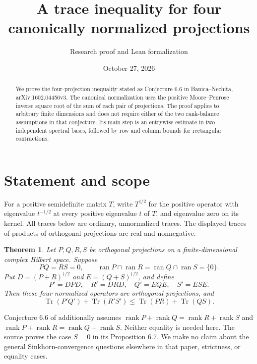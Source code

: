\documentclass[11pt]{article}
\title{A trace inequality for four canonically normalized projections}
\author{Research proof and Lean formalization}
\date{October 27, 2026}
\newtheorem{theorem}{Theorem}
\DeclareMathOperator{\Tr}{Tr}
\DeclareMathOperator{\ran}{ran}
\begin{document}
\maketitle
\begin{abstract}
We prove the four-projection inequality stated as Conjecture 6.6 in
Banica--Nechita, arXiv:1602.04456v3. The canonical normalization uses the positive
Moore--Penrose inverse square root of the sum of each pair of projections.
The proof applies to arbitrary finite dimensions and does not require either
of the two rank-balance assumptions in that conjecture. Its main step is an
entrywise estimate in two independent spectral bases, followed by row and
column bounds for rectangular contractions.
\end{abstract}

\section{Statement and scope}
For a positive semidefinite matrix $T$, write $T^{\dagger/2}$ for the
positive operator with eigenvalue $t^{-1/2}$ at every positive eigenvalue $t$
of $T$, and eigenvalue zero on its kernel. All traces below are ordinary,
unnormalized traces. The displayed traces of products of orthogonal
projections are real and nonnegative.

\begin{theorem}\label{thm:main}
Let $P,Q,R,S$ be orthogonal projections on a finite-dimensional complex
Hilbert space. Suppose
\[
 PQ=RS=0,\qquad
 \ran P\cap\ran R=\ran Q\cap\ran S=\{0\}.
\]
Put $D=(P+R)^{\dagger/2}$ and $E=(Q+S)^{\dagger/2}$, and define
\[
 P'=DPD,\quad R'=DRD,\quad Q'=EQE,\quad S'=ESE.
\]
Then these four normalized operators are orthogonal projections, and
\begin{equation}\label{eq:target}
 \Tr(P'Q')+\Tr(R'S')\leq \Tr(PR)+\Tr(QS).
\end{equation}
\end{theorem}

Conjecture 6.6 of \cite[p.~20]{BN} additionally assumes
$\operatorname{rank}P+\operatorname{rank}Q=
\operatorname{rank}R+\operatorname{rank}S$ and
$\operatorname{rank}P+\operatorname{rank}R=
\operatorname{rank}Q+\operatorname{rank}S$.
Neither equality is needed here. The source proves the case $S=0$ in its
Proposition 6.7. We make no claim about the general Sinkhorn-convergence
questions elsewhere in that paper, strictness, or equality cases.
\end{document}
